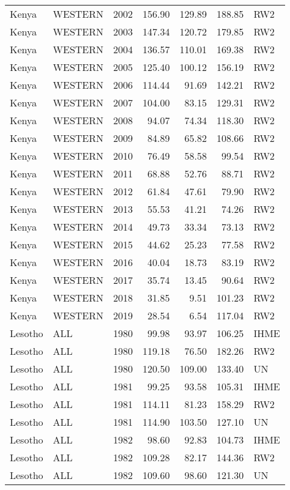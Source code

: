 \begin{longtable}{lllrrrl}
  Kenya & WESTERN & 2002 & 156.90 & 129.89 & 188.85 & RW2 \\ 
  Kenya & WESTERN & 2003 & 147.34 & 120.72 & 179.85 & RW2 \\ 
  Kenya & WESTERN & 2004 & 136.57 & 110.01 & 169.38 & RW2 \\ 
  Kenya & WESTERN & 2005 & 125.40 & 100.12 & 156.19 & RW2 \\ 
  Kenya & WESTERN & 2006 & 114.44 & 91.69 & 142.21 & RW2 \\ 
  Kenya & WESTERN & 2007 & 104.00 & 83.15 & 129.31 & RW2 \\ 
  Kenya & WESTERN & 2008 & 94.07 & 74.34 & 118.30 & RW2 \\ 
  Kenya & WESTERN & 2009 & 84.89 & 65.82 & 108.66 & RW2 \\ 
  Kenya & WESTERN & 2010 & 76.49 & 58.58 & 99.54 & RW2 \\ 
  Kenya & WESTERN & 2011 & 68.88 & 52.76 & 88.71 & RW2 \\ 
  Kenya & WESTERN & 2012 & 61.84 & 47.61 & 79.90 & RW2 \\ 
  Kenya & WESTERN & 2013 & 55.53 & 41.21 & 74.26 & RW2 \\ 
  Kenya & WESTERN & 2014 & 49.73 & 33.34 & 73.13 & RW2 \\ 
  Kenya & WESTERN & 2015 & 44.62 & 25.23 & 77.58 & RW2 \\ 
  Kenya & WESTERN & 2016 & 40.04 & 18.73 & 83.19 & RW2 \\ 
  Kenya & WESTERN & 2017 & 35.74 & 13.45 & 90.64 & RW2 \\ 
  Kenya & WESTERN & 2018 & 31.85 & 9.51 & 101.23 & RW2 \\ 
  Kenya & WESTERN & 2019 & 28.54 & 6.54 & 117.04 & RW2 \\ 
  Lesotho & ALL & 1980 & 99.98 & 93.97 & 106.25 & IHME \\ 
  Lesotho & ALL & 1980 & 119.18 & 76.50 & 182.26 & RW2 \\ 
  Lesotho & ALL & 1980 & 120.50 & 109.00 & 133.40 & UN \\ 
  Lesotho & ALL & 1981 & 99.25 & 93.58 & 105.31 & IHME \\ 
  Lesotho & ALL & 1981 & 114.11 & 81.23 & 158.29 & RW2 \\ 
  Lesotho & ALL & 1981 & 114.90 & 103.50 & 127.10 & UN \\ 
  Lesotho & ALL & 1982 & 98.60 & 92.83 & 104.73 & IHME \\ 
  Lesotho & ALL & 1982 & 109.28 & 82.17 & 144.36 & RW2 \\ 
  Lesotho & ALL & 1982 & 109.60 & 98.60 & 121.30 & UN \\ 

\end{longtable}

